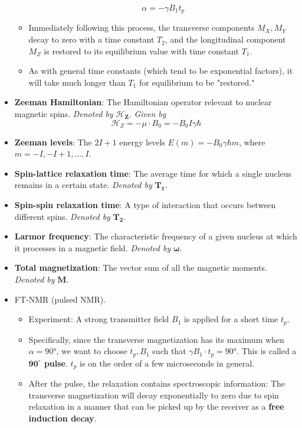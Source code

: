 \documentclass[../notes.tex]{subfiles}
\begin{document}
\begin{itemize}
\begin{itemize}
        \begin{equation*}
            \alpha = -\gamma B_1t_p
        \end{equation*}
        \item Immediately following this process, the transverse components $M_X,M_Y$ decay to zero with a time constant $T_2$, and the longitudinal component $M_Z$ is restored to its equilibrium value with time constant $T_1$.
        \item As with general time constants (which tend to be exponential factors), it will take much longer than $T_1$ for equilibrium to be "restored."
    \end{itemize}
    \item \textbf{Zeeman Hamiltonian}: The Hamiltonian operator relevant to nuclear magnetic spins. \emph{Denoted by} $\bm{\mathcal{H}_Z}$. \emph{Given by}
    \begin{equation*}
        \mathcal{H}_Z = -\mu\cdot B_0 = -B_0I\gamma\hbar
    \end{equation*}
    \item \textbf{Zeeman levels}: The $2I+1$ energy levels $E(m)=-B_0\gamma\hbar m$, where $m=-I,-I+1,\dots,I$.
    \item \textbf{Spin-lattice relaxation time}: The average time for which a single nucleus remains in a certain state. \emph{Denoted by} $\bm{T_1}$.
    \item \textbf{Spin-spin relaxation time}: A type of interaction that occurs between different spins. \emph{Denoted by} $\bm{T_2}$.
    \item \textbf{Larmor frequency}: The characteristic frequency of a given nucleus at which it processes in a magnetic field. \emph{Denoted by} $\bm{\omega}$.
    \item \textbf{Total magnetization}: The vector sum of all the magnetic moments. \emph{Denoted by} $\pmb{\mathbf{M}}$.
    \item FT-NMR (pulsed NMR).
    \begin{itemize}
        \item Experiment: A strong transmitter field $B_1$ is applied for a short time $t_p$.
        \item Specifically, since the transverse magnetization has its maximum when $\alpha=\ang{90}$, we want to choose $t_p,B_1$ such that $\gamma B_1\cdot t_p=\ang{90}$. This is called a \textbf{$\bm{90^\circ}$ pulse}. $t_p$ is on the order of a few microseconds in general.
        \item After the pulse, the relaxation contains spectroscopic information: The transverse magnetization will decay exponentially to zero due to spin relaxation in a manner that can be picked up by the receiver as a \textbf{free induction decay}.

\end{itemize}
\end{itemize}
\end{document}
